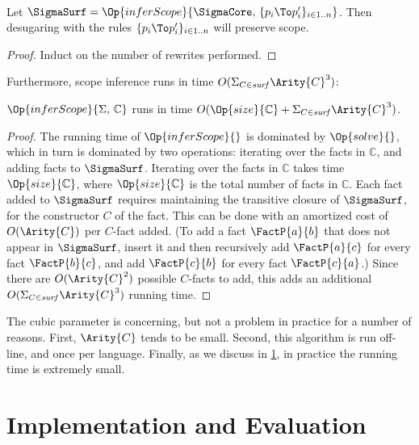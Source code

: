   \begin{corollary}
    \\%
    Let $\SigmaSurf =
    \Op{inferScope}{\SigmaCore,\,\{p_i \To p_i'\}_{i \in 1..n}}$.
    Then desugaring with the rules $\{p_i \To p_i'\}_{i \in 1..n}$
    will preserve scope.
  \end{corollary}
  \begin{proof}
    Induct on the number of rewrites performed.
  \end{proof}

  Furthermore, scope inference runs in time
  $O(\Sigma_{C \in \mathit{surf}} \Arity{C}^3)$:

  \begin{lemma}
    $\Op{inferScope}{\Sigma,\,\mathbb{C}}$ runs in time
    $O(\Op{size}{\mathbb{C}} + \Sigma_{C \in \mathit{surf}} \Arity{C}^3)$.
  \end{lemma}

  \begin{proof}
    The running time of $\Op{inferScope}{}$ is dominated by
    $\Op{solve}{}$, which in turn is dominated by two operations:
    iterating over the facts in $\mathbb{C}$, and adding facts to $\SigmaSurf$.
    Iterating over the facts in $\mathbb{C}$ takes time $\Op{size}{\mathbb{C}}$, where
    $\Op{size}{\mathbb{C}}$ is the total number of facts in $\mathbb{C}$.  Each fact
    added to $\SigmaSurf$ requires maintaining the transitive closure of
    $\SigmaSurf$, for the constructor $C$ of the fact. This can be done
    with an amortized cost of $O(\Arity{C})$ per $C$-fact added.  (To
    add a fact $\FactP{a}{b}$ that does not appear in $\SigmaSurf$,
    insert it and then recursively add $\FactP{a}{c}$ for every fact
    $\FactP{b}{c}$, and add $\FactP{c}{b}$ for every fact $\FactP{c}{a}$.)
    Since there are $O(\Arity{C}^2)$ possible $C$-facts to add, this
    adds an additional $O(\Sigma_{C \in \mathit{surf}} \Arity{C}^3)$
    running time.
  \end{proof}

The cubic parameter is concerning, but not a problem in practice for a
number of reasons. First, $\Arity{C}$ tends to be small.
Second, this algorithm is run off-line, and once per language.
Finally, as we discuss in \cref{sec:rscope-impl}, in practice the running
time is extremely small.


\section{Implementation and Evaluation}
\label{sec:rscope-impl}

